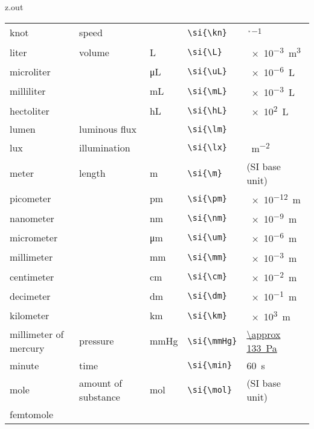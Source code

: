 \begin{VerbatimOut}{z.out}
{\begin{longtable}{@{}P{1.4in}P{1in}llP{1.8in}@{}}
    \vsp
    knot&
      speed&
      \si{\kn}&
      \verb+\si{\kn}+&
      \si{\M\per\h}\\
    \vsp
    liter&
      volume&
      \si{\L}&
      \verb+\si{\L}+&
      \SI{e-3}{m\cubed}\\
    \quad microliter&
      \ditto&
      \si{\uL}&
      \verb+\si{\uL}+&
      \SI{e-6}{\L}\\
    \quad milliliter&
      \ditto&
      \si{\mL}&
      \verb+\si{\mL}+&
      \SI{e-3}{\L}\\
    \quad hectoliter&
      \ditto&
      \si{\hL}&
      \verb+\si{\hL}+&
      \SI{e2}{\L}\\
    \vsp
    lumen&
      luminous flux&
      \si{\lm}&
      \verb+\si{\lm}+&
      \si{\cd\sr}\\
    \vsp
    lux&
      illumination&
      \si{\lx}&
      \verb+\si{\lx}+&
      \si{\lm\per\m\squared}\\
    \vsp
    meter&
      length&
      \si{\m}&
      \verb+\si{\m}+&
      (SI base unit)\\
    \quad picometer&
      \ditto&
      \si{\pm}&
      \verb+\si{\pm}+&
      \SI{e-12}{\m}\\
    \quad nanometer&
      \ditto&
      \si{\nm}&
      \verb+\si{\nm}+&
      \SI{e-9}{\m}\\
    \quad micrometer&
      \ditto&
      \si{\um}&
      \verb+\si{\um}+&
      \SI{e-6}{\m}\\
    \quad millimeter&
      \ditto&
      \si{\mm}&
      \verb+\si{\mm}+&
      \SI{e-3}{\m}\\
    \quad centimeter&
      \ditto&
      \si{\cm}&
      \verb+\si{\cm}+&
      \SI{e-2}{\m}\\
    \quad decimeter&
      \ditto&
      \si{\dm}&
      \verb+\si{\dm}+&
      \SI{e-1}{\m}\\
    \quad kilometer&
      \ditto&
      \si{\km}&
      \verb+\si{\km}+&
      \SI{e3}{\m}\\
    \vsp
    millimeter of mercury&
      pressure&
      \si{\mmHg}&
      \verb+\si{\mmHg}+&
      \href{https://en.wikipedia.org/wiki/Millimetre_of_mercury}{\SI{\approx 133}{\Pa}}\\
    \vsp
    minute&
      time&
      \si{\min}&
      \verb+\si{\min}+&
      \SI{60}{\s}\\
    \vsp
    mole&
      amount of substance&
      \si{\mol}&
      \verb+\si{\mol}+&
      (SI base unit)\\
    \quad femtomole&

\end{longtable}}
\end{VerbatimOut}
